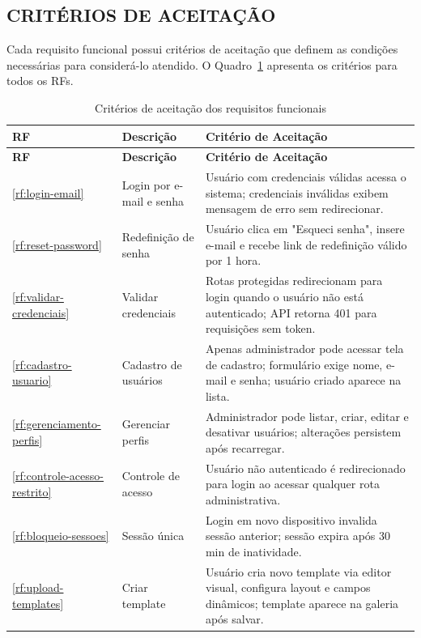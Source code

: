 \subsection{CRITÉRIOS DE ACEITAÇÃO}

Cada requisito funcional possui critérios de aceitação que definem as condições necessárias para considerá-lo atendido. O Quadro~\ref{qua:criterios} apresenta os critérios para todos os RFs.

\renewcommand{\arraystretch}{0.9}
\small
\begingroup
\renewcommand{\tablename}{Quadro}
\renewcommand{\LTcaptype}{quadro}
\begin{longtable}{p{1cm} p{3.2cm} p{10.8cm}}
\caption{Critérios de aceitação dos requisitos funcionais}
\label{qua:criterios}\\
\toprule
\textbf{RF} & \textbf{Descrição} & \textbf{Critério de Aceitação} \\
\midrule
\endfirsthead
\toprule
\textbf{RF} & \textbf{Descrição} & \textbf{Critério de Aceitação} \\
\midrule
\endhead
\bottomrule
\endfoot
\bottomrule
\endlastfoot
\ref{rf:login-email} & Login por e-mail e senha & Usuário com credenciais válidas acessa o sistema; credenciais inválidas exibem mensagem de erro sem redirecionar. \\
\ref{rf:reset-password} & Redefinição de senha & Usuário clica em "Esqueci senha", insere e-mail e recebe link de redefinição válido por 1 hora. \\
\ref{rf:validar-credenciais} & Validar credenciais & Rotas protegidas redirecionam para login quando o usuário não está autenticado; API retorna 401 para requisições sem token. \\
\ref{rf:cadastro-usuario} & Cadastro de usuários & Apenas administrador pode acessar tela de cadastro; formulário exige nome, e-mail e senha; usuário criado aparece na lista. \\
\ref{rf:gerenciamento-perfis} & Gerenciar perfis & Administrador pode listar, criar, editar e desativar usuários; alterações persistem após recarregar. \\
\ref{rf:controle-acesso-restrito} & Controle de acesso & Usuário não autenticado é redirecionado para login ao acessar qualquer rota administrativa. \\
\ref{rf:bloqueio-sessoes} & Sessão única & Login em novo dispositivo invalida sessão anterior; sessão expira após 30 min de inatividade. \\
\midrule
\ref{rf:upload-templates} & Criar template & Usuário cria novo template via editor visual, configura layout e campos dinâmicos; template aparece na galeria após salvar. \\

\end{longtable}
